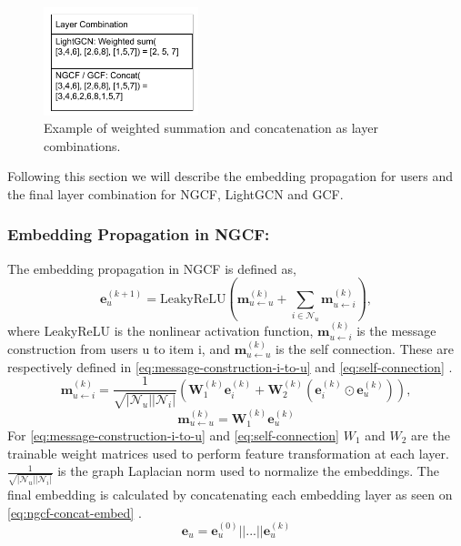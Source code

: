 \begin{figure}[h!]
    \includegraphics[width=0.4\textwidth]{figures/layer-combination.png}
    \centering
    \caption{Example of weighted summation and concatenation as layer combinations.}
    \label{fig:layer-combination}
\end{figure}
Following this section we will describe the embedding propagation for users and the final layer combination for NGCF, LightGCN and GCF.

\subsubsection{Embedding Propagation in NGCF:}
The embedding propagation in NGCF is defined as,
\begin{equation}
    \mathbf{e}_{u}^{(k+1)} = \mbox{LeakyReLU}(\mathbf{m}^{(k)}_{u \leftarrow u} + \sum^{}_{i \in \mathcal{N}_u} \mathbf{m}^{(k)}_{u \leftarrow i}),
    \label{eq:ngcf-embedding-propagation}
\end{equation}
where LeakyReLU is the nonlinear activation function, $\mathbf{m}^{(k)}_{u \leftarrow i}$ is the message construction from users u to item i, and $\mathbf{m}^{(k)}_{u \leftarrow u}$ is the self connection.
These are respectively defined in \autoref{eq:message-construction-i-to-u} and \autoref{eq:self-connection} \cite{NGCF_2019}.
\begin{equation}
    \mathbf{m}^{(k)}_{u \leftarrow i} = \frac{1}{\sqrt{|\mathcal{N}_u||\mathcal{N}_i|}}(\mathbf{W}^{(k)}_1\mathbf{e}^{(k)}_i + \mathbf{W}^{(k)}_2(\mathbf{e}^{(k)}_i \odot \mathbf{e}^{(k)}_u)),
    \label{eq:message-construction-i-to-u}
\end{equation}
\begin{equation}
    \mathbf{m}^{(k)}_{u \leftarrow u} = \mathbf{W}_1^{(k)}\mathbf{e}_u^{(k)}
    \label{eq:self-connection}
\end{equation}
For \autoref{eq:message-construction-i-to-u} and \autoref{eq:self-connection} $W_1$ and $W_2$ are the trainable weight matrices used to perform feature transformation at each layer.
$\frac{1}{\sqrt{|\mathcal{N}_u||\mathcal{N}_i|}}$ is the graph Laplacian norm used to normalize the embeddings.
The final embedding is calculated by concatenating each embedding layer as seen on \autoref{eq:ngcf-concat-embed} \cite{NGCF_2019}.
\begin{equation}
    \mathbf{e}_u = \mathbf{e}_u^{(0)}||...||\mathbf{e}_u^{(k)}
    \label{eq:ngcf-concat-embed}
\end{equation}

